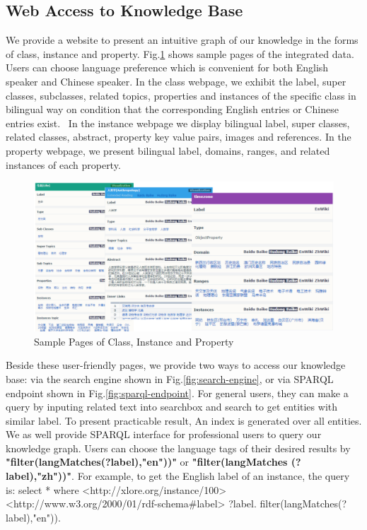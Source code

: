 \documentclass[runningheads,a4paper]{llncs}
\begin{document}
\subsection{Web Access to Knowledge Base}
We provide a website to present an intuitive graph of our knowledge in the forms of class, instance and property. Fig.\ref{fig:xlore} shows sample pages of the integrated data. Users can choose language preference which is convenient for both English speaker and Chinese speaker. In the class webpage, we exhibit the label, super classes, subclasses, related topics, properties and instances of the specific class in bilingual way on condition that the corresponding English entries or Chinese entries exist.  In the instance webpage we display bilingual label, super classes, related classes, abstract, property key value pairs, images and references. In the property webpage, we present bilingual label, domains, ranges, and related instances of each property.
\begin{figure}[ht]
    \centerline{\includegraphics[width=1\columnwidth]{fig/xlore}}
    \caption{Sample Pages of Class, Instance and Property}
    \label{fig:xlore}
\end{figure}%
Beside these user-friendly pages, we provide two ways to access our knowledge base: via the search engine shown in Fig.\ref{fig:search-engine}, or via SPARQL endpoint shown in Fig.\ref{fig:sparql-endpoint}. For general users, they can make a query by inputing related text into searchbox and search to get entities with similar label. To present practicable result, An index is generated over all entities. We as well provide SPARQL interface for professional users to query our knowledge graph. Users can choose the language tags of their desired results by \textbf{"filter(langMatches(?label),"en"))"} or \textbf{"filter(langMatches (?label),"zh"))"}. For example, to get the English label of an instance, the query is: select * where {<http://xlore.org/instance/100> <http://www.w3.org/2000/01/rdf-schema#label> ?label. filter(langMatches(?label),"en"))}.
\end{document}
